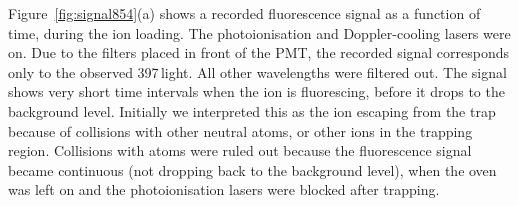 %


Figure~\ref{fig:signal854}(a) shows a recorded fluorescence signal as a function of time, during the ion loading. The photoionisation and Doppler-cooling lasers were on. Due to the filters placed in front of the PMT, the recorded signal corresponds only to the observed 397\nm\,light. All other wavelengths were filtered out. The signal shows very short time intervals when the ion is fluorescing, before it drops to the background level. Initially we interpreted this as the ion escaping from the trap because of collisions with other neutral \CaI{} atoms, or other \Ca{} ions in the trapping region. Collisions with \CaI{} atoms were ruled out because the fluorescence signal became continuous (not dropping back to the background level), when the \CaI{} oven was left on and the photoionisation lasers were blocked after trapping. 

